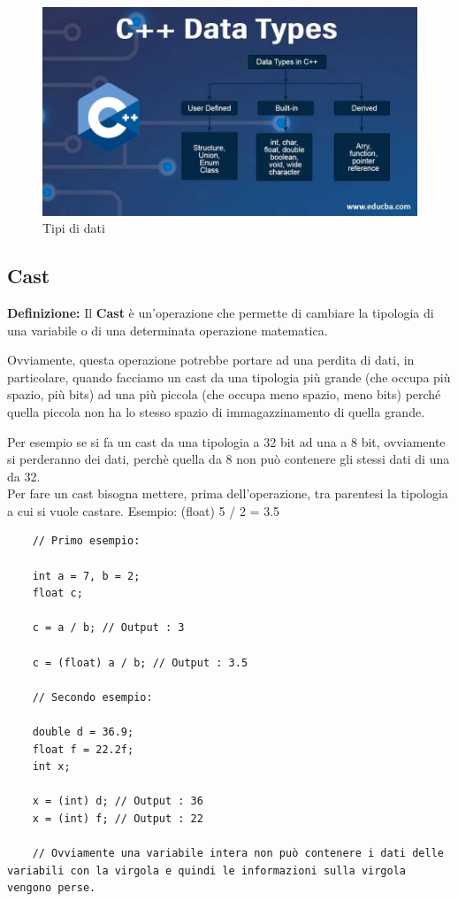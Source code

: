 \begin{figure}[H] %
	\centering
	\includegraphics[width=1\textwidth, height=1\textheight, keepaspectratio]{./imgs/data_types.jpg}
	\caption{Tipi di dati}
	\label{fig:data_types2}
\end{figure}

\subsection{Cast}

\textsf{\small \textbf{Definizione: } Il \textbf{Cast} è un'operazione che permette di cambiare la tipologia di una variabile o di una determinata operazione matematica.} 

\textsf{\small Ovviamente, questa operazione potrebbe portare ad una perdita di dati, in particolare, quando facciamo un cast da una tipologia più grande (che occupa più spazio, più bits) ad una più piccola (che occupa meno spazio, meno bits) perché quella piccola non ha lo stesso spazio di immagazzinamento di quella grande.} 

\textsf{\small Per esempio se si fa un cast da una tipologia a 32 bit ad una a 8 bit, ovviamente si perderanno dei dati, perchè quella da 8 non può contenere gli stessi dati di una da 32.} \\

\textsf{\small Per fare un cast bisogna mettere, prima dell'operazione, tra parentesi la tipologia a cui si vuole castare. Esempio: (float) 5 / 2 = 3.5} \\

\begin{lstlisting}
	// Primo esempio:
	
	int a = 7, b = 2;
	float c;
	
	c = a / b; // Output : 3
	
	c = (float) a / b; // Output : 3.5
	
	// Secondo esempio:
	
	double d = 36.9;
	float f = 22.2f;
	int x;
	
	x = (int) d; // Output : 36
	x = (int) f; // Output : 22
	
	// Ovviamente una variabile intera non può contenere i dati delle variabili con la virgola e quindi le informazioni sulla virgola vengono perse.
\end{lstlisting}


